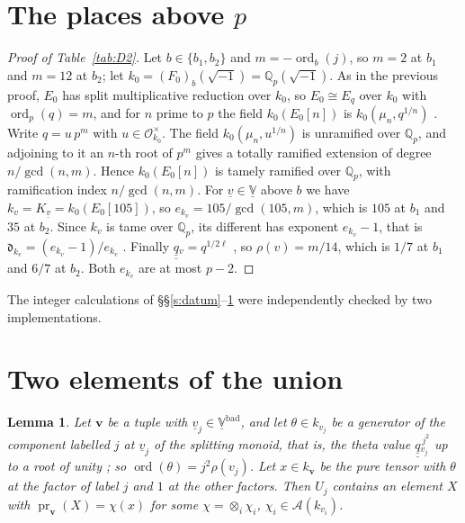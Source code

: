 \documentclass[11pt]{amsart}
\newtheorem{lemma}[theorem]{Lemma}
\theoremstyle{remark}
\newcommand{\Qp}{\mathbb Q_p}
\newcommand{\cO}{\mathcal O}
\newcommand{\cA}{\mathcal A}
\newcommand{\dd}{\mathfrak d}
\newcommand{\qq}{\underline{\underline{q}}{}}
\newcommand{\VV}{\underline{\mathbb V}}
\newcommand{\Vbad}{\underline{\mathbb V}^{\mathrm{bad}}}
\newcommand{\pr}{\operatorname{pr}}
\newcommand{\bv}{\mathbf v}
\begin{document}
\section{The places above \texorpdfstring{$p$}{p}}\label{s:local}

\begin{proof}[Proof of Table~\ref{tab:D2}]
Let $b\in\{b_1,b_2\}$ and $m=-\operatorname{ord}_b(j)$, so $m=2$ at $b_1$ and $m=12$ at $b_2$; let
$k_0=(F_0)_b(\sqrt{-1})=\Qp(\sqrt{-1})$. As in the previous proof, $E_0$ has split multiplicative reduction over
$k_0$, so $E_0\cong E_q$ over $k_0$ with $\operatorname{ord}_p(q)=m$, and for $n$ prime to $p$ the field
$k_0(E_0[n])$ is $k_0(\mu_n,q^{1/n})$ \cite[App.~C, Thm.~14.1, and the expansion $j=q^{-1}+744+\cdots$ on
p.~444]{Sil}. Write $q=u\,p^m$ with $u\in\cO_{k_0}^\times$. The field $k_0(\mu_n,u^{1/n})$ is unramified over
$\Qp$, and adjoining to it an $n$-th root of $p^m$ gives a totally ramified extension of degree $n/\gcd(n,m)$.
Hence $k_0(E_0[n])$ is tamely ramified over $\Qp$, with ramification index $n/\gcd(n,m)$. For $\underline v\in\VV$
above $b$ we have $k_v=K_{\underline v}=k_0(E_0[105])$, so $e_{k_v}=105/\gcd(105,m)$, which is $105$ at $b_1$ and
$35$ at $b_2$. Since $k_v$ is tame over $\Qp$, its different has exponent $e_{k_v}-1$, that is
$\dd_{k_v}=(e_{k_v}-1)/e_{k_v}$ \cite[Prop.~1.3(i), pp.~11--12]{IUT4}. Finally
$\qq_v=q^{1/2\ell}$ \cite[Ex.~3.2(iv), p.~71]{IUT1}, so $\rho(v)=m/14$, which is $1/7$ at $b_1$ and $6/7$ at
$b_2$. Both $e_{k_v}$ are at
most $p-2$.
\end{proof}

The integer calculations of \S\S\ref{s:datum}--\ref{s:local} were independently checked by two implementations.

\section{Two elements of the union}\label{s:union}

\begin{lemma}\label{l:member}
Let $\bv$ be a tuple with $\underline v_j\in\Vbad$, and let $\theta\in k_{v_j}$ be a generator of the component
labelled $j$ at $\underline v_j$ of the splitting monoid, that is, the theta value $\qq_{v_j}^{\,j^2}$ up to a root
of unity \cite[p.~11]{IUT3}; so $\operatorname{ord}(\theta)=j^2\rho(v_j)$. Let $x\in k_{\bv}$ be the pure tensor
with $\theta$ at the factor of label $j$ and $1$ at the other factors. Then $U_j$ contains an element $X$ with
$\pr_{\bv}(X)=\chi(x)$ for some $\chi=\otimes_i\chi_i$, $\chi_i\in\cA(k_{v_i})$.
\end{lemma}
\end{document}
